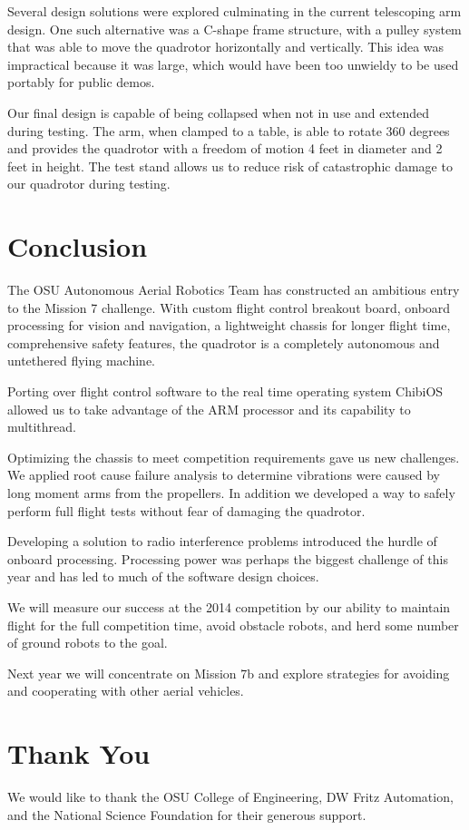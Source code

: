 \documentclass[12pt,letterpaper]{article} \usepackage[margin=1in]{geometry}
\begin{document}
Several design solutions were explored culminating in the current telescoping
arm design. One such alternative was a C-shape frame structure, with a pulley
system that was able to move the quadrotor horizontally and vertically. This
idea was impractical because it was large, which would have been too unwieldy
to be used portably for public demos.

Our final design is capable of being collapsed when not in use and extended
during testing. The arm, when clamped to a table, is able to rotate 360 degrees
and provides the quadrotor with a freedom of motion 4 feet in diameter and
2 feet in height. The test stand allows us to reduce risk of catastrophic
damage to our quadrotor during testing.



\section*{Conclusion}

The OSU Autonomous Aerial Robotics Team has constructed an ambitious entry to
the Mission 7 challenge. With custom flight control breakout board, onboard
processing for vision and navigation, a lightweight chassis for longer
flight time, comprehensive safety features, the quadrotor is a completely
autonomous and untethered flying machine.

Porting over flight control software to the real time operating system ChibiOS
allowed us to take advantage of the ARM processor and its capability to
multithread.

Optimizing the chassis to meet competition requirements gave us new challenges.
We applied root cause failure analysis to determine vibrations were caused by
long moment arms from the propellers. In addition we developed a way to safely
perform full flight tests without fear of damaging the quadrotor.

Developing a solution to radio interference problems introduced the hurdle of
onboard processing. Processing power was perhaps the biggest challenge of this
year and has led to much of the software design choices.

We will measure our success at the 2014 competition by our ability to maintain
flight for the full competition time, avoid obstacle robots, and herd some
number of ground robots to the goal.

Next year we will concentrate on Mission 7b and explore strategies for avoiding
and cooperating with other aerial vehicles.



\section*{Thank You}

We would like to thank the OSU College of Engineering, DW Fritz Automation, and
the National Science Foundation for their generous support.
\end{document}
